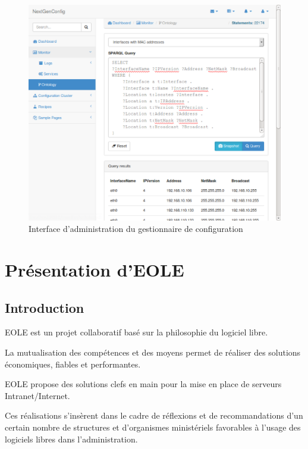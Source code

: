 \begin{figure}[H]
    \centerline{\includegraphics[width=\textwidth]{img/trifle_gui}}
    \caption{Interface d'administration du gestionnaire de configuration}
    \label{fig:trifle_gui}
\end{figure}



\chapter{Présentation d'EOLE}
\label{appendix:EOLE}

\section{Introduction}

EOLE est un projet collaboratif basé sur la philosophie du logiciel libre.

La mutualisation des compétences et des moyens permet de réaliser des solutions
économiques, fiables et performantes.

EOLE propose des solutions clefs en main pour la mise en place de serveurs
Intranet/Internet.

Ces réalisations s’insèrent dans le cadre de réflexions et de recommandations
d’un certain nombre de structures et d’organismes ministériels favorables à
l’usage des logiciels libres dans l’administration.

